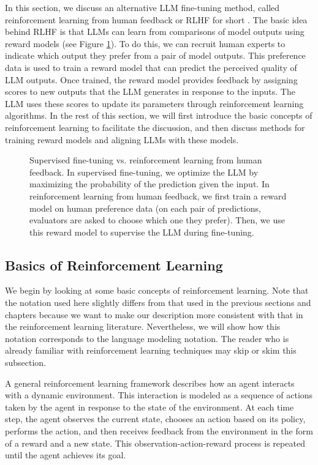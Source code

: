 In this section, we discuss an alternative LLM fine-tuning method, called reinforcement learning from human feedback or RLHF for short \cite{christiano-etal:2017deep,stiennon-etal:2020learning}. The basic idea behind RLHF is that LLMs can learn from comparisons of model outputs using reward models (see Figure \ref{fig:sft-vs-rlhf}). To do this, we can recruit human experts to indicate which output they prefer from a pair of model outputs. This preference data is used to train a reward model that can predict the perceived quality of LLM outputs. Once trained, the reward model provides feedback by assigning scores to new outputs that the LLM generates in response to the inputs. The LLM uses these scores to update its parameters through reinforcement learning algorithms. In the rest of this section, we will first introduce the basic concepts of reinforcement learning to facilitate the discussion, and then discuss methods for training reward models and aligning LLMs with these models.

\begin{figure}[!t]
\centering

\caption{Supervised fine-tuning vs. reinforcement learning from human feedback. In supervised fine-tuning, we optimize the LLM by maximizing the probability of the prediction given the input. In reinforcement learning from human feedback, we first train a reward model on human preference data (on each pair of predictions, evaluators are asked to choose which one they prefer). Then, we use this reward model to supervise the LLM during fine-tuning.}
\label{fig:sft-vs-rlhf}
\end{figure}

\subsection{Basics of Reinforcement Learning}
\label{sec:rl-basics}

\noindent We begin by looking at some basic concepts of reinforcement learning. Note that the notation used here slightly differs from that used in the previous sections and chapters because we want to make our description more consistent with that in the reinforcement learning literature. Nevertheless, we will show how this notation corresponds to the language modeling notation. The reader who is already familiar with reinforcement learning techniques may skip or skim this subsection.

A general reinforcement learning framework describes how an agent interacts with a dynamic environment. This interaction is modeled as a sequence of actions taken by the agent in response to the state of the environment. At each time step, the agent observes the current state, chooses an action based on its policy, performs the action, and then receives feedback from the environment in the form of a reward and a new state. This observation-action-reward process is repeated until the agent achieves its goal.

